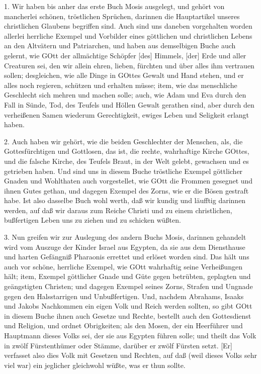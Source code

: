 1. Wir haben bis anher das erste Buch Mosis ausgelegt, und gehört von mancherlei schönen, tröstlichen Sprüchen, darinnen die Hauptartikel unseres christlichen Glaubens begriffen sind. Auch sind uns daneben vorgehalten worden allerlei herrliche Exempel und Vorbilder eines göttlichen und christlichen Lebens an den Altvätern und Patriarchen, und haben aus demselbigen Buche auch gelernt, wie GOtt der allmächtige Schöpfer [des] Himmels, [der] Erde und aller Creaturen sei, den wir allein ehren, lieben, fürchten und über alles ihm vertrauen sollen; desgleichen, wie alle Dinge in GOttes Gewalt und Hand stehen, und er alles noch regieren, schützen und erhalten müsse; item, wie das menschliche Geschlecht sich mehren und
machen solle; auch, wie Adam und Eva durch den Fall in Sünde, Tod, des Teufels und Höllen Gewalt gerathen sind, aber durch den verheißenen Samen wiederum Gerechtigkeit, ewiges Leben und Seligkeit erlangt haben.

2. Auch haben wir gehört, wie die beiden Geschlechter der Menschen, als, die Gottesfürchtigen und Gottlosen, das ist, die rechte, wahrhaftige Kirche GOttes, und die falsche Kirche, des Teufels Braut, in der Welt gelebt, gewachsen und es getrieben haben. Und sind uns in diesem Buche tröstliche Exempel göttlicher Gnaden und Wohlthaten auch vorgestellet, wie GOtt die Frommen gesegnet und ihnen Gutes gethan, und dagegen Exempel des Zorns, wie er die Bösen gestraft habe. Ist also dasselbe Buch wohl werth, daß wir kundig und läufftig darinnen werden, auf daß wir daraus zum Reiche Christi und zu einem christlichen, bußfertigen Leben uns zu ziehen und zu schicken wüßten.

3. Nun greifen wir zur Auslegung des andern Buchs Mosis, darinnen gehandelt wird vom Auszuge der Kinder Israel aus Egypten, da sie aus dem Diensthause und harten Gefängniß Pharaonis errettet und erlöset worden sind. Das hält uns auch vor schöne, herrliche Exempel, wie GOtt wahrhaftig seine Verheißungen hält; item, Exempel göttlicher Gnade und Güte gegen betrübten, geplagten und geängstigten Christen; und dagegen Exempel seines Zorns, Strafen und Ungnade gegen den Halsstarrigen und Unbußfertigen. Und, nachdem Abrahams, Isaaks und Jakobs Nachkommen ein eigen Volk und Reich werden sollten, so gibt GOtt in diesem Buche ihnen auch Gesetze und Rechte, bestellt auch den Gottesdienst und Religion, und ordnet Obrigkeiten; als den Mosen, der ein Heerführer und Hauptmann dieses Volks sei, der sie aus Egypten führen solle; und theilt das Volk in zwölf Fürstenthümer oder Stämme, darüber er zwölf Fürsten setzt. [Er] verfasset also dies Volk mit Gesetzen und Rechten, auf daß (weil dieses Volks sehr viel war) ein jeglicher gleichwohl wüßte, was er thun sollte.

